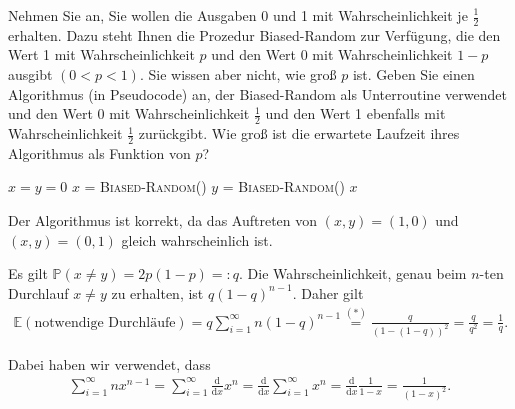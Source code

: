 
\begin{exercise}

\phantom{}Nehmen Sie an, Sie wollen die Ausgaben 0 und 1 mit Wahrscheinlichkeit je $\frac{1}{2}$ erhalten. Dazu steht Ihnen die Prozedur Biased-Random zur Verfügung, die den Wert 1 mit Wahrscheinlichkeit $p$ und den Wert 0 mit Wahrscheinlichkeit $1-p$ ausgibt $(0 < p < 1)$. Sie wissen aber nicht, wie groß $p$ ist. Geben Sie einen Algorithmus (in Pseudocode) an, der Biased-Random als Unterroutine verwendet und den Wert 0 mit Wahrscheinlichkeit $\frac{1}{2}$ und den Wert 1 ebenfalls mit Wahrscheinlichkeit $\frac{1}{2}$ zurückgibt. Wie groß ist die erwartete Laufzeit ihres Algorithmus als Funktion von $p$?

\end{exercise}



\begin{solution}
\phantom{}

  \begin{algorithm}
      \begin{algorithmic}[1]
          \State $x = y = 0$
              \State $x$ = \textsc{Biased-Random()}
              \State $y$ = \textsc{Biased-Random()}
          \EndWhile
          \State \Return $x$
          \EndProcedure
      \end{algorithmic}
  \end{algorithm}

Der Algorithmus ist \glqq korrekt\grqq{}, da das Auftreten von $(x, y) = (1, 0)$ und $(x, y) = (0, 1)$ gleich wahrscheinlich ist.

Es gilt $\mathbb P(x \neq y) = 2p(1-p) =\colon q$. Die Wahrscheinlichkeit, genau beim $n$-ten Durchlauf $x \neq y$ zu erhalten, ist $q (1-q)^{n-1}$. Daher gilt
\begin{align*}
    \mathbb E(\text{notwendige Durchläufe}) = q \sum_{i = 1}^\infty n (1-q)^{n-1} \stackrel{(\ast)}{=} \frac{q}{(1-(1-q))^2} = \frac{q}{q^2} = \frac{1}{q}.
\end{align*}

Dabei haben wir verwendet, dass
\begin{align}\tag{$\ast$}
    \sum_{i = 1}^\infty nx^{n-1} = \sum_{i = 1}^\infty \frac{\mathrm d}{\mathrm dx} x^n =
    \frac{\mathrm d}{\mathrm dx} \sum_{i = 1}^\infty x^n =
    \frac{\mathrm d}{\mathrm dx} \frac{1}{1-x} = \frac{1}{(1-x)^2}.
\end{align}

\end{solution}
